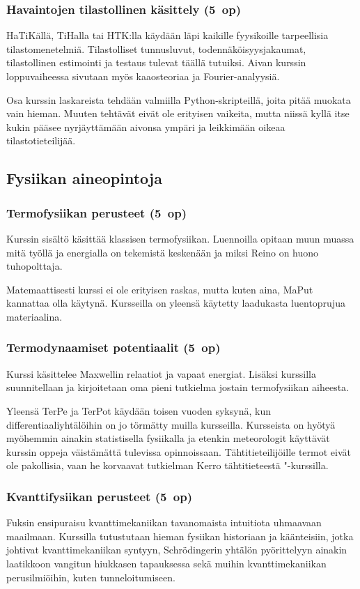 \documentclass[../ala_hataile.tex]{subfiles}
\begin{document}
	\subsubsection*{Havaintojen tilastollinen käsittely (5~op)}
	HaTiKällä, TiHalla tai HTK:lla käydään läpi kaikille fyysikoille
	tarpeellisia tilastomenetelmiä. Tilastolliset
	tunnusluvut, todennäköisyysjakaumat,
	tilastollinen estimointi ja testaus tulevat täällä
	tutuiksi. Aivan kurssin loppuvaiheessa sivutaan myös kaaosteoriaa ja Fourier-analyysiä. 
	
	Osa kurssin laskareista tehdään valmiilla Python-skripteillä, joita pitää muokata vain hieman. Muuten tehtävät eivät ole erityisen vaikeita, mutta niissä kyllä itse kukin pääsee nyrjäyttämään aivonsa ympäri ja leikkimään oikeaa tilastotieteilijää.
	\subsection*{Fysiikan aineopintoja}
	\subsubsection*{Termofysiikan perusteet (5~op)}
	Kurssin sisältö käsittää klassisen termofysiikan. Luennoilla opitaan muun muassa mitä työllä ja energialla on tekemistä keskenään ja miksi Reino on
	huono tuho\-polttaja.
	
	Matemaattisesti kurssi ei ole erityisen
	raskas, mutta kuten aina, MaPut kannattaa
	olla käytynä. Kursseilla on yleensä käytetty
	laadukasta luento\-prujua materiaalina.
	
	\subsubsection*{Termodynaamiset potentiaalit (5~op)}
	Kurssi käsittelee Maxwellin relaatiot ja vapaat energiat. Lisäksi kurssilla suunnitellaan ja kirjoitetaan
	oma pieni tutkielma jostain termo\-fysiikan
	aiheesta.
	
	Yleensä TerPe ja TerPot käydään toisen vuoden
	syksynä, kun differentiaaliyhtälöihin on jo
	törmätty muilla kursseilla. Kursseista on
	hyötyä myöhemmin ainakin statistisella
	fysiikalla ja etenkin meteorologit käyttävät
	kurssin oppeja väistämättä tulevissa opinnoissaan. Tähtitieteilijöille termot eivät ole pakollisia, vaan he korvaavat tutkielman Kerro tähtitieteestä "-kurssilla. 
	
	\subsubsection*{Kvanttifysiikan perusteet (5~op)}
	Fuksin ensipuraisu kvantti\-mekaniikan
	tavanomaista intuitiota uhmaavaan maailmaan.
	Kurssilla tutustutaan hieman fysiikan
	historiaan ja käänteisiin, jotka johtivat
	kvanttimekaniikan syntyyn, Schrödingerin
	yhtälön pyörittelyyn ainakin laatikkoon
	vangitun hiukkasen tapauksessa sekä muihin
	kvantti\-mekaniikan perusilmiöihin, kuten
	tunneloitumiseen.
	
\end{document}
